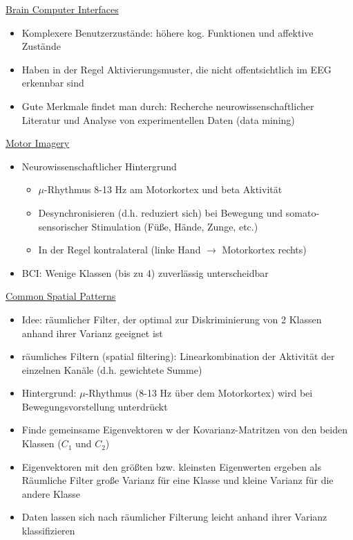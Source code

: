 \documentclass[a4paper,10pt,oneside]{article}
\begin{document}
\underline{Brain Computer Interfaces} \\ 
	\begin{itemize}
		\item Komplexere Benutzerzustände: höhere kog. Funktionen und affektive Zustände
		\item Haben in der Regel Aktivierungsmuster, die nicht offentsichtlich im EEG erkennbar sind
		\item Gute Merkmale findet man durch: Recherche neurowissenschaftlicher Literatur und Analyse von experimentellen Daten (data mining)
	\end{itemize}
	
\underline{Motor Imagery} \\ 
	\begin{itemize}
		\item Neurowissenschaftlicher Hintergrund
			\begin{itemize}
				\item $\mu$-Rhythmus 8-13 Hz am Motorkortex und beta Aktivität
				\item Desynchronisieren (d.h. reduziert sich) bei Bewegung
und somato-sensorischer Stimulation (Füße, Hände, Zunge, etc.)
				\item In der Regel kontralateral (linke Hand $\rightarrow$ Motorkortex rechts)
			\end{itemize}
		\item BCI: Wenige Klassen (bis zu 4) zuverlässig unterscheidbar
	\end{itemize}
 		
\underline{Common Spatial Patterns} \\  		
	\begin{itemize}
		\item Idee: räumlicher Filter, der optimal zur Diskriminierung von 2 Klassen anhand ihrer Varianz geeignet ist
		\item räumliches Filtern (spatial filtering): Linearkombination der Aktivität der einzelnen Kanäle (d.h. gewichtete Summe)
		\item Hintergrund: $\mu$-Rhythmus (8-13 Hz über dem Motorkortex) wird bei Bewegungsvorstellung unterdrückt
		\item Finde gemeinsame Eigenvektoren w der Kovarianz-Matritzen von den beiden Klassen ($C_1$ und $C_2$)
		\item Eigenvektoren mit den größten bzw. kleinsten Eigenwerten ergeben als Räumliche Filter große Varianz für eine Klasse und kleine Varianz für die andere Klasse
		\item Daten lassen sich nach räumlicher Filterung leicht anhand ihrer Varianz klassifizieren
	\end{itemize}
	
\end{document}
